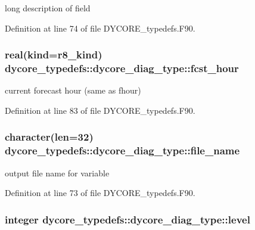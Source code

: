 long description of field 



Definition at line 74 of file D\-Y\-C\-O\-R\-E\-\_\-typedefs.\-F90.

\subsubsection[{fcst\-\_\-hour}]{\setlength{\rightskip}{0pt plus 5cm}real(kind=r8\-\_\-kind) dycore\-\_\-typedefs\-::dycore\-\_\-diag\-\_\-type\-::fcst\-\_\-hour}\label{structdycore__typedefs_1_1dycore__diag__type_a857feb4213b48ce81b3d295561b92058}


current forecast hour (same as fhour) 



Definition at line 83 of file D\-Y\-C\-O\-R\-E\-\_\-typedefs.\-F90.

\subsubsection[{file\-\_\-name}]{\setlength{\rightskip}{0pt plus 5cm}character(len=32) dycore\-\_\-typedefs\-::dycore\-\_\-diag\-\_\-type\-::file\-\_\-name}\label{structdycore__typedefs_1_1dycore__diag__type_adce883539145f85406cd69b9286b2f3c}


output file name for variable 



Definition at line 73 of file D\-Y\-C\-O\-R\-E\-\_\-typedefs.\-F90.

\subsubsection[{level}]{\setlength{\rightskip}{0pt plus 5cm}integer dycore\-\_\-typedefs\-::dycore\-\_\-diag\-\_\-type\-::level}\label{structdycore__typedefs_1_1dycore__diag__type_ac5a325a7f34fb5df278e141ddd62a283}


